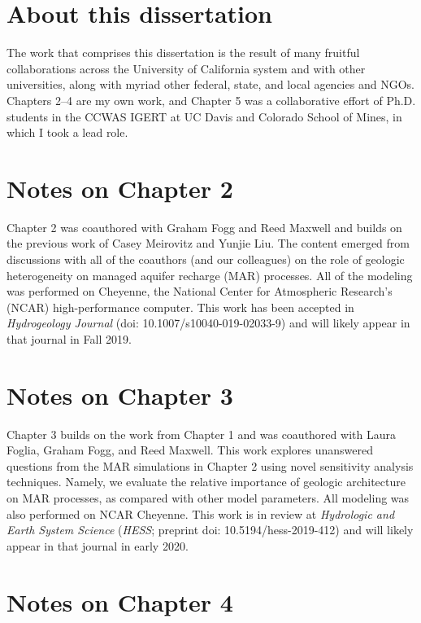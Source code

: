 \section*{About this dissertation}   

The work that comprises this dissertation is the result of many fruitful collaborations across the University of California system and with other universities, along with myriad other federal, state, and local agencies and NGOs. Chapters 2--4 are my own work, and Chapter 5 was a collaborative effort of Ph.D. students in the CCWAS IGERT at UC Davis and Colorado School of Mines, in which I took a lead role. 

\section*{Notes on Chapter 2}

Chapter 2 was coauthored with Graham Fogg and Reed Maxwell and builds on the previous work of Casey Meirovitz and Yunjie Liu. The content emerged from discussions with all of the coauthors (and our colleagues) on the role of geologic heterogeneity on managed aquifer recharge (MAR) processes. All of the modeling was performed on Cheyenne, the National Center for Atmospheric Research's (NCAR) high-performance computer. This work has been accepted in \textit{Hydrogeology Journal} (doi: 10.1007/s10040-019-02033-9) and will likely appear in that journal in Fall 2019.
   
\section*{Notes on Chapter 3} 

Chapter 3 builds on the work from Chapter 1 and was coauthored with Laura Foglia, Graham Fogg, and Reed Maxwell. This work explores unanswered questions from the MAR simulations in Chapter 2 using novel sensitivity analysis techniques. Namely, we evaluate the relative importance of geologic architecture on MAR processes, as compared with other model parameters. All modeling was also performed on NCAR Cheyenne. This work is in review at \textit{Hydrologic and Earth System Science} (\textit{HESS}; preprint doi: 10.5194/hess-2019-412) and will likely appear in that journal in early 2020. 
    
\section*{Notes on Chapter 4} 

